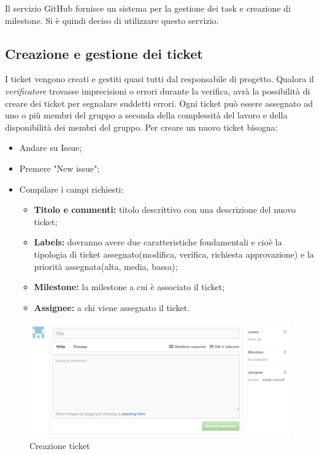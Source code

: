 Il servizio GitHub fornisce un sistema per la gestione dei task e creazione di milestone.
Si è quindi deciso di utilizzare questo servizio.\\

\subsection{Creazione e gestione dei ticket}

I ticket vengono creati e gestiti quasi tutti dal responsabile di progetto.
Qualora il \textit{verificatore} trovasse imprecisioni o errori durante la verifica, avrà la possibilità di creare dei ticket per segnalare suddetti errori.
Ogni ticket può essere assegnato ad uno o più membri del gruppo a seconda della complessità del lavoro e della disponibilità dei membri del gruppo.
Per creare un nuovo ticket bisogna:

\begin{itemize}
	\item Andare su Issue;
	\item Premere "New issue";
	\item Compilare i campi richiesti:
		\begin{itemize}
			\item \textbf{Titolo e commenti:} titolo descrittivo con una descrizione del nuovo ticket;
			\item \textbf{Labels:} dovranno avere due caratteristiche fondamentali e cioè la tipologia di ticket assegnato(modifica, verifica, richiesta approvazione) e la priorità assegnata(alta, media, bassa);
			\item \textbf{Milestone:} la milestone a cui è associato il ticket;
			\item \textbf{Assignee:} a chi viene assegnato il ticket.
		\end{itemize}
\end{itemize}
\begin{figure}[h]
\centering
\includegraphics[width=0.7\linewidth]{img/ticket}
\caption[Creazione ticket]{Creazione ticket}
\label{fig:ticket}
\end{figure}


